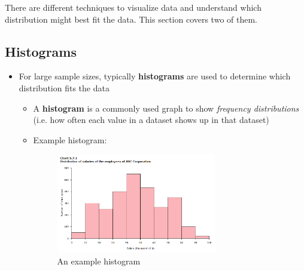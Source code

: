 \documentclass[12pt]{article}
\begin{document}
There are different techniques to visualize data and understand which distribution might best fit the data. This section covers two of them.

\subsection*{Histograms}
\begin{itemize}
	\item For large sample sizes, typically \textbf{histograms} are used to
	      determine which distribution fits the data
	      \begin{itemize}
		      \item A \textbf{histogram} is a commonly used graph to show \emph{frequency distributions} (i.e.
		            how often each value in a dataset shows up in that dataset)
		      \item Example histogram:
		            \begin{figure}[H]
			            \begin{center}
				            \includegraphics[width=0.7\textwidth]{1}
			            \end{center}
			            \caption{An example histogram}\label{fig:1}
		            \end{figure}
	      \end{itemize}
\end{itemize}
\end{document}

